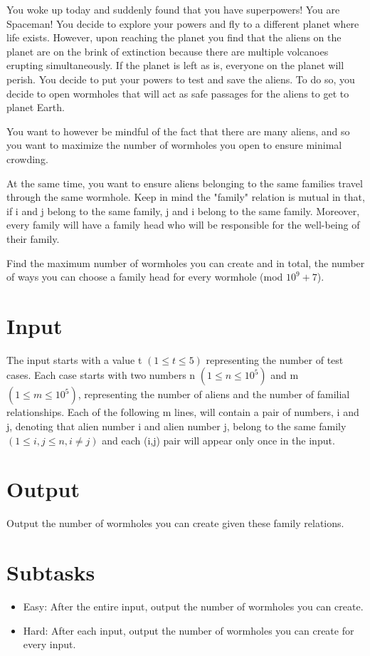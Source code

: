 
You woke up today and suddenly found that you have superpowers! You are Spaceman! You decide to explore your powers and fly to a different planet where life exists. However, upon reaching the planet you find that the aliens on the planet are on the brink of extinction because there are multiple volcanoes erupting simultaneously. If the planet is left as is, everyone on the planet will perish. You decide to put your powers to test and save the aliens. To do so, you decide to open wormholes that will act as safe passages for the aliens to get to planet Earth.

You want to however be mindful of the fact that there are many aliens, and so you want to maximize the number of wormholes you open to ensure minimal crowding. 

At the same time, you want to ensure aliens belonging to the same families travel through the same wormhole. Keep in mind the "family" relation is mutual in that, if i and j belong to the same family, j and i belong to the same family. Moreover, every family will have a family head who will be responsible for the well-being of their family. 

Find the maximum number of wormholes you can create and in total, the number of ways you can choose a family head for every wormhole (mod $10^{9}+7$).\newline

\section*{Input}
 \indent The input starts with a value t $(1 \le t \le 5)$ representing the number of test cases. 
  Each case starts with two numbers n $(1 \le n \le 10^{5})$ and m $(1 \le m \le 10^{5})$, representing the number of aliens and the number of familial relationships. Each of the following m lines, will contain a pair of numbers, i and j, denoting that alien number i and alien number j, belong to the same family $(1 \le i,j \le n, i \neq j)$ and each (i,j) pair will appear only once in the input.
  
\section*{Output}
Output the number of wormholes you can create given these family relations.

\section*{Subtasks}
\begin{itemize}
	 \item Easy: After the entire input, output the number of wormholes you can create.
    	 \item Hard: After each input, output the number of wormholes you can create for every input.
\end{itemize}
